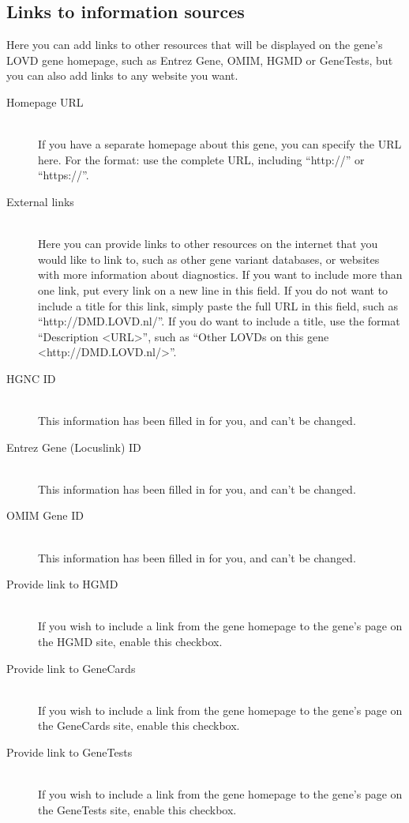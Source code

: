 \documentclass[a4paper,oneside,openany,12pt]{memoir}
\begin{document}
\subsection{Links to information sources}
Here you can add links to other resources that will be displayed on the gene's LOVD gene homepage,
 such as Entrez Gene, OMIM, HGMD or GeneTests, but you can also add links to any website you want.
\begin{description}
  \item[Homepage URL] \hfill \\
  If you have a separate homepage about this gene, you can specify the URL here.
  For the format: use the complete URL, including ``http://'' or ``https://''.
  \item[External links] \hfill \\
  Here you can provide links to other resources on the internet that you would like to link to,
   such as other gene variant databases, or websites with more information about diagnostics.
  If you want to include more than one link, put every link on a new line in this field.
  If you do not want to include a title for this link, simply paste the full URL in this field, such as ``http://DMD.LOVD.nl/''.
  If you do want to include a title, use the format ``Description <URL>'', such as ``Other LOVDs on this gene <http://DMD.LOVD.nl/>''.
  \item[HGNC ID] \hfill \\
  This information has been filled in for you, and can't be changed.
  \item[Entrez Gene (Locuslink) ID] \hfill \\
  This information has been filled in for you, and can't be changed.
  \item[OMIM Gene ID] \hfill \\
  This information has been filled in for you, and can't be changed.
  \item[Provide link to HGMD] \hfill \\
  If you wish to include a link from the gene homepage to the gene's page on the HGMD site, enable this checkbox.
  \item[Provide link to GeneCards] \hfill \\
  If you wish to include a link from the gene homepage to the gene's page on the GeneCards site, enable this checkbox.
  \item[Provide link to GeneTests] \hfill \\
  If you wish to include a link from the gene homepage to the gene's page on the GeneTests site, enable this checkbox.

\end{description}
\end{document}
